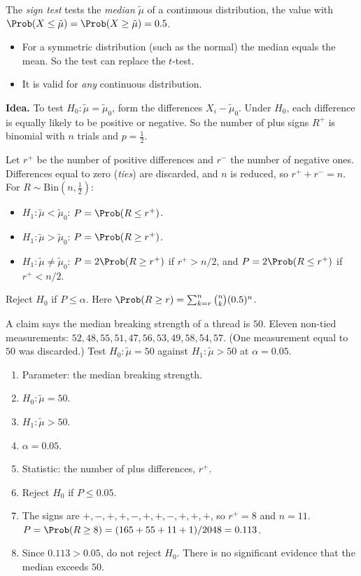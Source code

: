The \emph{sign test} tests the \emph{median} $\tilde\mu$ of a continuous distribution, the value with $\Prob(X\le\tilde\mu)=\Prob(X\ge\tilde\mu)=0.5$.
\begin{itemize}
  \item For a symmetric distribution (such as the normal) the median equals the mean. So the test can replace the $t$-test.
  \item It is valid for \emph{any} continuous distribution.
\end{itemize}

\textbf{Idea.} To test $H_0:\tilde\mu=\tilde\mu_0$, form the differences $X_i-\tilde\mu_0$. Under $H_0$, each difference is equally likely to be positive or negative. So the number of plus signs $R^+$ is binomial with $n$ trials and $p=\tfrac12$.

\begin{definition}
Let $r^+$ be the number of positive differences and $r^-$ the number of negative ones. Differences equal to zero (\emph{ties}) are discarded, and $n$ is reduced, so $r^++r^-=n$. For $R\sim\mathrm{Bin}(n,\tfrac12)$:
\begin{itemize}
  \item $H_1:\tilde\mu<\tilde\mu_0$: $P=\Prob(R\le r^+)$.
  \item $H_1:\tilde\mu>\tilde\mu_0$: $P=\Prob(R\ge r^+)$.
  \item $H_1:\tilde\mu\ne\tilde\mu_0$: $P=2\Prob(R\ge r^+)$ if $r^+>n/2$, and $P=2\Prob(R\le r^+)$ if $r^+<n/2$.
\end{itemize}
Reject $H_0$ if $P\le\alpha$. Here $\Prob(R\ge r)=\sum_{k=r}^n\binom nk(0.5)^n$.
\end{definition}

\begin{example}\label{ex:sign}
A claim says the median breaking strength of a thread is $50$. Eleven non-tied measurements: $52,48,55,51,47,56,53,49,58,54,57$. (One measurement equal to $50$ was discarded.) Test $H_0:\tilde\mu=50$ against $H_1:\tilde\mu>50$ at $\alpha=0.05$.
\begin{enumerate}[label=\arabic*.]
  \item Parameter: the median breaking strength.
  \item $H_0:\tilde\mu=50$.
  \item $H_1:\tilde\mu>50$.
  \item $\alpha=0.05$.
  \item Statistic: the number of plus differences, $r^+$.
  \item Reject $H_0$ if $P\le0.05$.
  \item The signs are $+,-,+,+,-,+,+,-,+,+,+$, so $r^+=8$ and $n=11$. $P=\Prob(R\ge8)=(165+55+11+1)/2048=0.113$.
  \item Since $0.113>0.05$, do not reject $H_0$. There is no significant evidence that the median exceeds $50$.
\end{enumerate}
\end{example}

